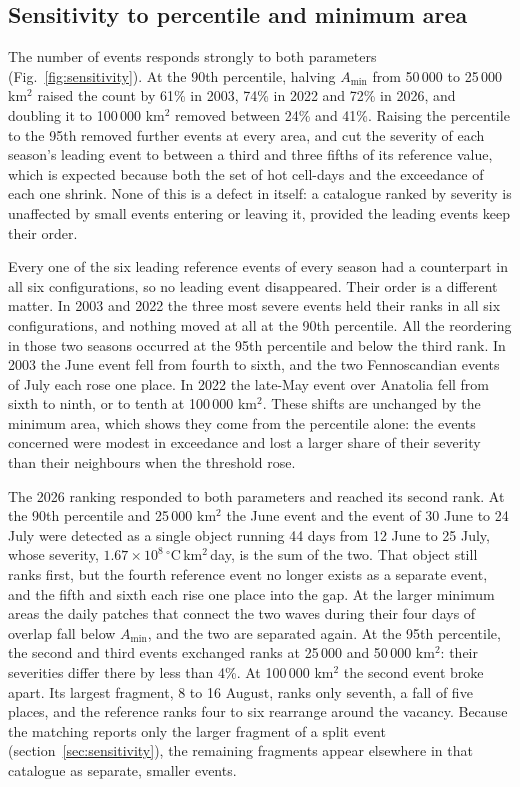 \documentclass{amsdraft}
\begin{document}
\subsection{Sensitivity to percentile and minimum area}
\label{sec:sens}

The number of events responds strongly to both parameters
(Fig.~\ref{fig:sensitivity}). At the 90th percentile, halving $A_{\min}$
from 50\,000 to 25\,000 km$^2$ raised the count by 61\% in 2003, 74\% in
2022 and 72\% in 2026, and doubling it to 100\,000 km$^2$ removed between
24\% and 41\%. Raising the percentile to the 95th removed further events
at every area, and cut the severity of each season's leading event to
between a third and three fifths of its reference value, which is
expected because both the set of hot cell-days and the
exceedance of each one shrink. None of this is a defect in itself: a
catalogue ranked by severity is unaffected by small events entering or
leaving it, provided the leading events keep their order.

Every one of the six leading reference events of every season had a
counterpart in all six configurations, so no leading event disappeared.
Their order is a different matter. In 2003 and 2022 the three most severe
events held their ranks in all six configurations, and nothing moved at
all at the 90th percentile. All the reordering in those two seasons
occurred at the 95th percentile and below the third rank. In 2003 the
June event fell from fourth to sixth, and the two Fennoscandian events of July
each rose one place. In 2022 the late-May event over Anatolia fell from sixth to
ninth, or to tenth at 100\,000 km$^2$. These shifts are unchanged by the
minimum area, which shows they come from the percentile alone: the events
concerned were modest in exceedance and lost a larger share of their
severity than their neighbours when the threshold rose.

The 2026 ranking responded to both parameters and reached its second rank.
At the 90th percentile and 25\,000 km$^2$ the June event and the event of
30 June to 24 July were detected as a single object running 44 days from
12 June to 25 July, whose severity,
$1.67\times10^{8}$\,$^\circ$C\,km$^2$\,day, is the sum of the two. That
object still ranks first, but the fourth reference event no longer exists
as a separate event, and the fifth and sixth each rise one place into the
gap. At the larger minimum areas the daily patches that connect the two
waves during their four days of overlap fall below $A_{\min}$, and the
two are separated again. At the 95th percentile, the second and third
events exchanged ranks at 25\,000 and 50\,000 km$^2$: their severities
differ there by less than 4\%. At 100\,000 km$^2$ the second event broke
apart. Its largest fragment, 8 to 16 August, ranks only seventh, a fall of
five places, and the reference ranks four to six rearrange around the
vacancy. Because the matching reports only the larger fragment of a
split event (section~\ref{sec:sensitivity}), the remaining fragments
appear elsewhere in that catalogue as separate, smaller events.
\end{document}
